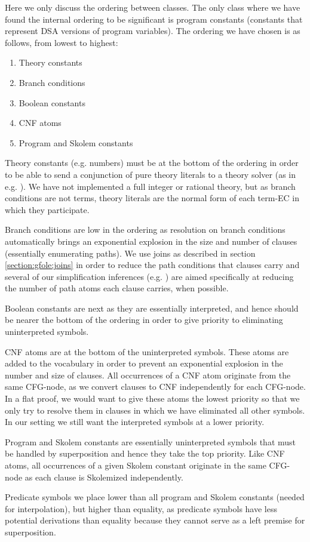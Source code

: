 Here we only discuss the ordering between classes. The only class where we have found the internal ordering to be significant is program constants (constants that represent DSA versions of program variables).
The ordering we have chosen is as follows, from lowest to highest:
\begin{enumerate}
	\item Theory constants
	\item Branch conditions
	\item Boolean constants
	\item CNF atoms
	\item Program and Skolem constants
\end{enumerate}


Theory constants (e.g. numbers) must be at the bottom of the ordering in order to be able to send a conjunction of pure theory literals to a theory solver (as in e.g. \cite{BaumgartnerWaldmann13}). We have not implemented a full integer or rational theory, but as branch conditions are not terms, theory literals are the normal form of each term-EC in which they participate.

Branch conditions are low in the ordering as resolution on branch conditions automatically brings an exponential explosion in the size and number of clauses (essentially enumerating paths). We use joins as described in section \ref{section:gfole:joins} in order to reduce the path conditions that clauses carry and several of our simplification inferences (e.g. ) are aimed specifically at reducing the number of path atoms each clause carries, when possible.


Boolean constants are next as they are essentially interpreted, and hence should be nearer the bottom of the ordering in order to give priority to eliminating uninterpreted symbols.

CNF atoms are at the bottom of the uninterpreted symbols. These atoms are added to the vocabulary in order to prevent an exponential explosion in the number and size of clauses.
All occurrences of a CNF atom originate from the same CFG-node, as we convert clauses to CNF independently for each CFG-node.
In a flat proof, we would want to give these atoms the lowest priority so that we only try to resolve them in clauses in which we have eliminated all other symbols. In our setting we still want the interpreted symbols at a lower priority. 

Program and Skolem constants are essentially uninterpreted symbols that must be handled by superposition and hence they take the top priority. Like CNF atoms, all occurrences of a given Skolem constant originate in the same CFG-node as each clause is Skolemized independently. 

Predicate symbols we place lower than all program and Skolem constants (needed for interpolation), but higher than equality, 
as predicate symbols have less potential derivations than equality because they cannot serve as a left premise for superposition.


